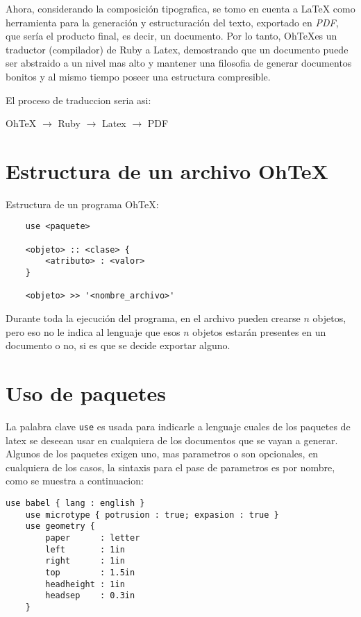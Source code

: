 \documentclass[12pt,letterpaper,titlepage,oneside,openright]{book}
\newcommand{\latex}{\LaTeX\xspace}
\newcommand{\ohtex}{OhTeX}
\begin{document}
Ahora, considerando la composición tipografica, se tomo en cuenta a \latex como
herramienta para la generación y estructuración del texto, exportado en
\textit{PDF}, que sería el producto final, es decir, un documento. Por lo tanto,
\ohtex es un traductor (compilador) de Ruby a Latex, demostrando que un
documento puede ser abstraido a un nivel mas alto y mantener una filosofia de
generar documentos bonitos y al mismo tiempo poseer una estructura compresible.

El proceso de traduccion seria asi:

\begin{center}
    OhTeX $\longrightarrow$ Ruby $\longrightarrow$ Latex $\longrightarrow$ PDF
\end{center}

\section{Estructura de un archivo \ohtex}

Estructura de un programa \ohtex:

\begin{center}
\begin{lstlisting}
    use <paquete>

    <objeto> :: <clase> {
        <atributo> : <valor> 
    }

    <objeto> >> '<nombre_archivo>'
\end{lstlisting}
\end{center}


Durante toda la ejecución del programa, en el archivo pueden crearse $n$
objetos, pero eso no le indica al lenguaje que esos $n$ objetos estarán
presentes en un documento o no, si es que se decide exportar alguno.

\section{Uso de paquetes}

La palabra clave \texttt{use} es usada para indicarle a lenguaje cuales de los
paquetes de latex se deseean usar en cualquiera de los documentos que se vayan a
generar. Algunos de los paquetes exigen uno, mas parametros o son opcionales, en
cualquiera de los casos, la sintaxis para el pase de parametros es por nombre,
como se muestra a continuacion:

\begin{center}
\begin{lstlisting}[caption={Paquetes},label=pkgs]
    use babel { lang : english }
    use microtype { potrusion : true; expasion : true }
    use geometry {
        paper      : letter
        left       : 1in
        right      : 1in
        top        : 1.5in
        headheight : 1in
        headsep    : 0.3in
    }
\end{lstlisting}
\end{center}
\end{document}
